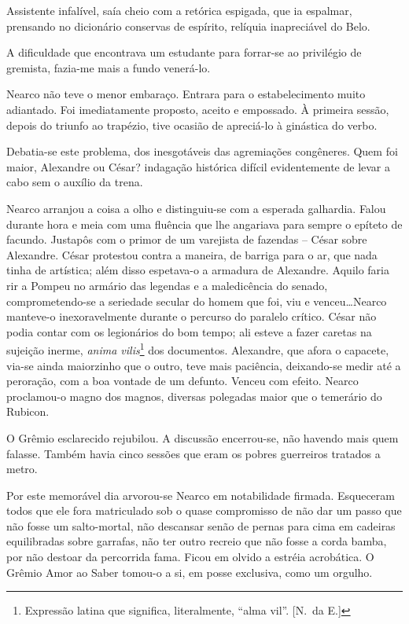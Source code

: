 Assistente infalível, saía cheio com a retórica espigada, que ia
espalmar, prensando no dicionário conservas de espírito, relíquia
inapreciável do Belo. 

A dificuldade que encontrava um estudante para
forrar{}-se ao privilégio de gremista, fazia{}-me mais a fundo
venerá{}-lo. 

Nearco não teve o menor embaraço. Entrara para o
estabelecimento muito adiantado. Foi imediatamente proposto, aceito e
empossado. À primeira sessão, depois do triunfo ao trapézio, tive
ocasião de apreciá{}-lo à ginástica do verbo. 

Debatia{}-se este
problema, dos inesgotáveis das agremiações congêneres. Quem foi maior,
Alexandre ou César? indagação histórica difícil evidentemente de levar
a cabo sem o auxílio da trena. 

Nearco arranjou a coisa a olho e
distinguiu{}-se com a esperada galhardia. Falou durante hora e meia com
uma fluência que lhe angariava para sempre o epíteto de facundo.
Justapôs com o primor de um varejista de fazendas -- César sobre
Alexandre. César protestou contra a maneira, de barriga para o ar, que
nada tinha de artística; além disso espetava{}-o a armadura de
Alexandre. Aquilo faria rir a Pompeu no armário das legendas e a
maledicência do senado, comprometendo{}-se a seriedade secular do homem
que foi, viu e venceu\ldots Nearco manteve{}-o inexoravelmente durante o
percurso do paralelo crítico. César não podia contar com os legionários
do bom tempo; ali esteve a fazer caretas na sujeição inerme, \textit{anima
vilis}\footnote{ Expressão latina que significa, literalmente, ``alma vil''. 
[N.~da E.]} dos documentos. 
Alexandre, que afora o capacete, via{}-se ainda
maiorzinho que o outro, teve mais paciência, deixando{}-se medir até a
peroração, com a boa vontade de um defunto. Venceu com efeito. Nearco
proclamou{}-o magno dos magnos, diversas polegadas maior que o
temerário do Rubicon. 

O Grêmio esclarecido rejubilou. A discussão
encerrou{}-se, não havendo mais quem falasse. Também havia cinco
sessões que eram os pobres guerreiros tratados a metro. 

Por este memorável dia arvorou{}-se Nearco em notabilidade firmada. Esqueceram
todos que ele fora matriculado sob o quase compromisso de não dar um
passo que não fosse um salto{}-mortal, não descansar senão de pernas
para cima em cadeiras equilibradas sobre garrafas, não ter outro
recreio que não fosse a corda bamba, por não destoar da percorrida
fama. Ficou em olvido a estréia acrobática. O Grêmio Amor ao Saber
tomou{}-o a si, em posse exclusiva, como um orgulho. 

